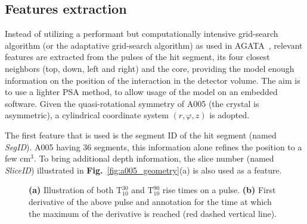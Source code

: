 \subsection{Features extraction}
\label{subsec:feature_extraction}

Instead of utilizing a performant but computationally intensive grid-search algorithm (or the adaptative grid-search algorithm) as used in AGATA~\cite{Venturelli2004}, relevant features are extracted from the pulses of the hit segment, its four closest neighbors (top, down, left and right) and the core, providing the model enough information on the position of the interaction in the detector volume. The aim is to use a lighter PSA method, to allow usage of the model on an embedded software. Given the quasi-rotational symmetry of A005 (the crystal is asymmetric), a cylindrical coordinate system $(r, \varphi, z)$ is adopted.

The first feature that is used is the segment ID of the hit segment (named \textit{SegID}). A005 having 36 segments, this information alone refines the position to a few cm$^3$. To bring additional depth information, the slice number (named \textit{SliceID}) illustrated in \textbf{Fig.}~\ref{fig:a005_geometry}(a) is also used as a feature.

\begin{figure}
\centering
{}
\caption{\textbf{(a)} Illustration of both T$^{30}_{10}$ and T$^{90}_{10}$ rise times on a pulse. \textbf{(b)} First derivative of the above pulse and annotation for the time at which the maximum of the derivative is reached (red dashed vertical line).}
\label{fig:pulse_t30_t90}
\end{figure}

